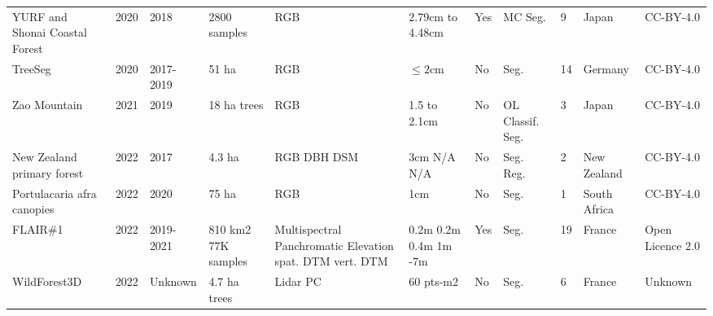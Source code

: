 \documentclass{CUP-JNL-DTM}%
\theoremstyle{definition}
\numberwithin{equation}{section}
\begin{document}
\begin{table*}[ht]
{\begin{fntable}
\begin{tabular}{p{1.5cm} | p{0.4cm} | p{1cm} | p{1.3cm} | p{1.2cm} : p{1.1cm} | p{0.4cm} | p{0.7cm} | p{0.8cm} | p{1cm} | p{1.1cm}}
YURF and Shonai Coastal Forest \cite{kentsch_computer_2020} & 2020 & 2018  & 2800 samples & RGB & 2.79cm to 4.48cm & Yes & MC \newline Seg. & 9 & Japan & CC-BY-4.0 \\

TreeSeg	\cite{schiefer_mapping_2020} & 2020 & 2017-2019 & 51 ha & RGB & $\leq 2$cm & No & Seg. & 14 & Germany & CC-BY-4.0 \\


Zao Mountain \cite{nguyen_individual_2021} & 2021 & 2019 & 18 ha  trees & RGB & 1.5 to 2.1cm & No & OL \newline Classif. \newline Seg. & 3 & Japan & CC-BY-4.0 \\

New Zealand primary forest \cite{kattenborn_convolutional_2020}	 & 2022 & 2017 & 4.3 ha & RGB \newline DBH \newline DSM & 3cm \newline N/A \newline N/A & No & Seg. \newline Reg. & 2 & New Zealand	 & CC-BY-4.0 \\

Portulacaria afra canopies \cite{galuszynski_automated_2022} & 2022 & 2020  & 75 ha & RGB & 1cm & No & Seg. & 1 & South Africa & CC-BY-4.0 \\

FLAIR\#1 \cite{garioud_flair_2022} & 2022 & 2019-2021 & 810 km2 \newline 77K samples & Multispectral \newline Panchromatic \newline Elevation \newline spat. DTM \newline vert. DTM & 0.2m \newline 0.2m \newline 0.4m \newline 1m -7m & Yes & Seg. & 19 & France & Open Licence 2.0 \\

WildForest3D \cite{kalinicheva_multi-layer_2022} & 2022 & Unknown & 4.7 ha  trees & Lidar PC & 60 pts-m2 & No & Seg. & 6 & France & Unknown \\


\end{tabular}
\end{fntable}}
\end{table*}
\end{document}

